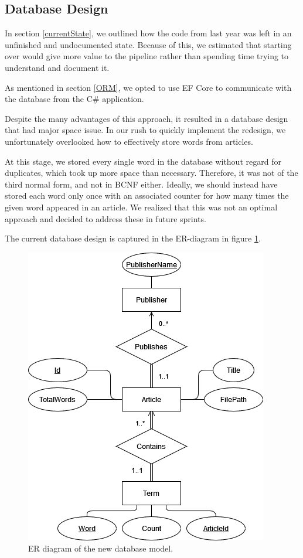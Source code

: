 \subsection{Database Design}\label{InitialDesign}

In section \ref{currentState}, we outlined how the code from last year was left in an unfinished and undocumented state. Because of this, we estimated that starting over would give more value to the pipeline rather than spending time trying to understand and document it.

As mentioned in section \ref{ORM}, we opted to use EF Core to communicate with the database from the C\# application.

Despite the many advantages of this approach, it resulted in a database design that had major space issue.
In our rush to quickly implement the redesign, we unfortunately overlooked how to effectively store words from articles. 

At this stage, we stored every single word in the database without regard for duplicates, which took up more space than necessary. Therefore, it was not of the third normal form, and not in BCNF either.
Ideally, we should instead have stored each word only once with an associated counter for how many times the given word appeared in an article.
We realized that this was not an optimal approach and decided to address these in future sprints.

The current database design is captured in the ER-diagram in figure \ref{newdatabaseER}.

\begin{figure}[htb!]
    \centering
    \includegraphics[scale=0.6]{Images/DbRedesign.png}
    \caption{ER diagram of the new database model.}
    \label{newdatabaseER}
\end{figure}

